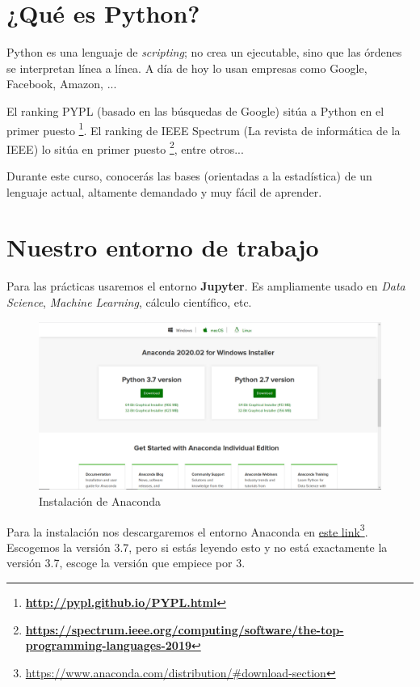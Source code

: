 \documentclass[openany,a4paper]{book}
\begin{document}
\setcounter{page}{1}

\section{¿Qué es Python?}

Python es una lenguaje de \textit{scripting}; no crea un ejecutable, sino que las órdenes se interpretan línea a línea. A día de hoy lo usan empresas como Google, Facebook, Amazon, ... 

El ranking PYPL (basado en las búsquedas de Google) sitúa a Python en el primer puesto \footnote{\textbf{\href{http://pypl.github.io/PYPL.html}{http://pypl.github.io/PYPL.html}}}. El ranking de IEEE Spectrum (La revista de informática de la IEEE) lo sitúa en primer puesto \footnote{\textbf{\href{https://spectrum.ieee.org/computing/software/the-top-programming-languages-2019}{https://spectrum.ieee.org/computing/software/the-top-programming-languages-2019}}}, entre otros...

Durante este curso, conocerás las bases (orientadas a la estadística) de un lenguaje actual, altamente demandado y muy fácil de aprender.

\section{Nuestro entorno de trabajo}

Para las prácticas usaremos el entorno \textbf{Jupyter}. Es ampliamente usado en \textit{Data Science}, \textit{Machine Learning}, cálculo científico, etc.

\begin{figure}[H]
    \centering
    \includegraphics[width=0.618\linewidth]{images/screenshots/anaconda/anaconda_download.PNG}
    \caption{Instalación de Anaconda}
\end{figure}

Para la instalación nos descargaremos el entorno Anaconda en \href{https://www.anaconda.com/distribution/#download-section}{este link}\footnote{\href{https://www.anaconda.com/distribution/\#download-section}{https://www.anaconda.com/distribution/\#download-section}}. Escogemos la versión 3.7, pero si estás leyendo esto y no está exactamente la versión 3.7, escoge la versión que empiece por 3.
\end{document}
